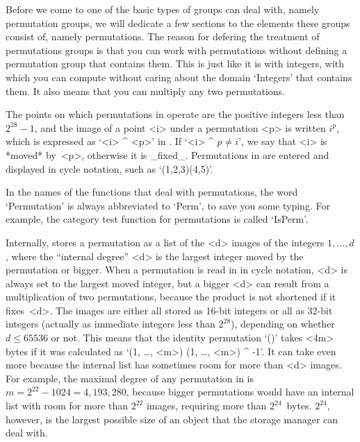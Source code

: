 
\def\labelto#1{\buildrel\lower0.8ex\hbox{$\scriptstyle #1$}\over\to}%


Before we come to one of the basic types of  groups {\GAP} can deal with,
namely permutation  groups,  we will   dedicate  a few  sections  to  the
elements these groups consist  of,  namely permutations. The reason   for
defering the treatment  of permutations groups is that  you can work with
permutations without defining  a permutation  group that contains   them.
This is just like it is with integers, with which you can compute without
caring about the domain `Integers' that contains them. It also means that
you can multiply any two permutations.

The points on  which permutations   in  {\GAP} operate  are the  positive
integers less than  $2^{28}-1$,  and the image   of a point <i> under   a
permutation <p> is written $i^p$,  which is expressed  as `<i> ^ <p>'  in
{\GAP}. If `<i> ^ $p\ne i$', we say that <i> is *moved* by~<p>, otherwise
it is _fixed_. Permutations in {\GAP} are  entered and displayed in cycle
notation, such as `(1,2,3)(4,5)'.

In the  names of the  {\GAP} functions  that deal with  permutations, the
word  `Permutation' is  always abbreviated  to `Perm', to  save  you some
typing. For  example,   the category  test  function  for permutations is
called `IsPerm'.

Internally, {\GAP}  stores a permutation as a  list of the  <d> images of
the  integers  $1,\ldots, d$,  where the ``internal  degree'' <d>  is the
largest integer moved by the permutation or bigger. When a permutation is
read  in  in  cycle  notation, <d> is  always  set  to  the largest moved
integer,   but a bigger   <d> can  result  from  a multiplication of  two
permutations, because the product is  not shortened if it fixes~<d>.  The
images are either all stored as 16-bit integers or all as 32-bit integers
(actually as {\GAP} immediate integers less  than $2^{28}$), depending on
whether  $d\le 65536$  or not. This  means that  the identity permutation
`()'  takes <4m> bytes  if it was calculated as   `(1, \dots, <m>) \* (1,
\dots, <m>) ^ -1'. It  can take even more  because the internal list  has
sometimes room for more than <d> images.  For example, the maximal degree
of   any permutation in  {\GAP}  is  $m  = 2^{22}-1024 =  4{,}193{,}280$,
because  bigger permutations  would have  an  internal list with room for
more than $2^{22}$ images, requiring  more than $2^{24}$~bytes. $2^{24}$,
however, is  the  largest possible size   of  an object that  the  {\GAP}
storage manager can deal with.


